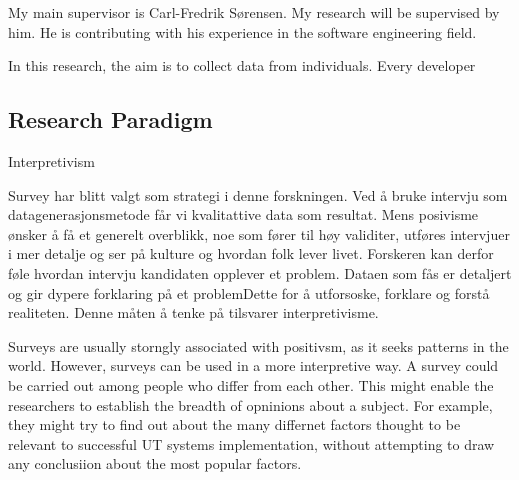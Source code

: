 My main supervisor is Carl-Fredrik Sørensen. My research will be supervised by him. He is contributing with his experience in the software engineering field. 

In this research, the aim is to collect data from individuals. Every developer

\subsection*{Research Paradigm}
Interpretivism 


Survey har blitt valgt som strategi i denne forskningen. Ved å bruke intervju som datagenerasjonsmetode får vi kvalitattive data som resultat. Mens posivisme ønsker å få et generelt overblikk, noe som fører til høy validiter, utføres intervjuer i mer detalje og ser på kulture og hvordan folk lever livet. Forskeren kan derfor føle hvordan intervju kandidaten opplever et problem. Dataen som fås er detaljert og gir dypere forklaring på et problemDette for å utforsoske, forklare og forstå realiteten. Denne måten å tenke på tilsvarer interpretivisme. 

Surveys are usually storngly associated with positivsm, as it seeks patterns in the world. However, surveys can be used in a more interpretive way. A survey could be carried out among people who differ from each other. This might enable the researchers to establish the breadth of opninions about a subject. For example, they might try to find out about the many differnet factors thought to be relevant to successful UT systems implementation, without attempting to draw any conclusiion about the most popular factors.

